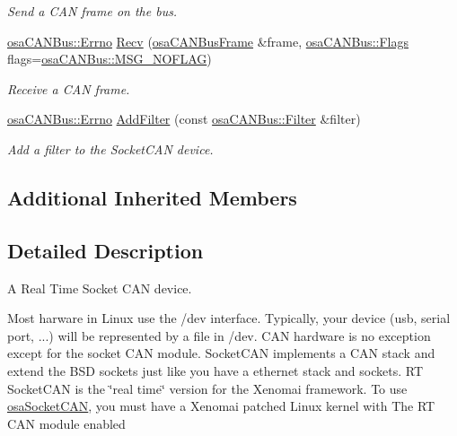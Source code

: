 \begin{DoxyCompactItemize}
\begin{DoxyCompactList}\small\item\em Send a C\+A\+N frame on the bus. \end{DoxyCompactList}\item 
\hyperlink{classosa_c_a_n_bus_a6fa3e95ec4c36932d0640e40e0748fde}{osa\+C\+A\+N\+Bus\+::\+Errno} \hyperlink{classosa_socket_c_a_n_a919c1f68caffb33ddcca41797553be58}{Recv} (\hyperlink{classosa_c_a_n_bus_frame}{osa\+C\+A\+N\+Bus\+Frame} \&frame, \hyperlink{classosa_c_a_n_bus_a74fe35c6059237887431f3ccece7b21b}{osa\+C\+A\+N\+Bus\+::\+Flags} flags=\hyperlink{classosa_c_a_n_bus_a74fe35c6059237887431f3ccece7b21ba30f701fa6e0dba6e274540941ccd3978}{osa\+C\+A\+N\+Bus\+::\+M\+S\+G\+\_\+\+N\+O\+F\+L\+A\+G})
\begin{DoxyCompactList}\small\item\em Receive a C\+A\+N frame. \end{DoxyCompactList}\item 
\hyperlink{classosa_c_a_n_bus_a6fa3e95ec4c36932d0640e40e0748fde}{osa\+C\+A\+N\+Bus\+::\+Errno} \hyperlink{classosa_socket_c_a_n_a139052b40505443b7c82e9983b873508}{Add\+Filter} (const \hyperlink{classosa_c_a_n_bus_1_1_filter}{osa\+C\+A\+N\+Bus\+::\+Filter} \&filter)
\begin{DoxyCompactList}\small\item\em Add a filter to the Socket\+C\+A\+N device. \end{DoxyCompactList}\end{DoxyCompactItemize}
\subsection*{Additional Inherited Members}


\subsection{Detailed Description}
A Real Time Socket C\+A\+N device. 

Most harware in Linux use the /dev interface. Typically, your device (usb, serial port, ...) will be represented by a file in /dev. C\+A\+N hardware is no exception except for the socket C\+A\+N module. Socket\+C\+A\+N implements a C\+A\+N stack and extend the B\+S\+D sockets just like you have a ethernet stack and sockets. R\+T Socket\+C\+A\+N is the \char`\"{}real time\char`\"{} version for the Xenomai framework. To use \hyperlink{classosa_socket_c_a_n}{osa\+Socket\+C\+A\+N}, you must have a Xenomai patched Linux kernel with The R\+T C\+A\+N module enabled 

